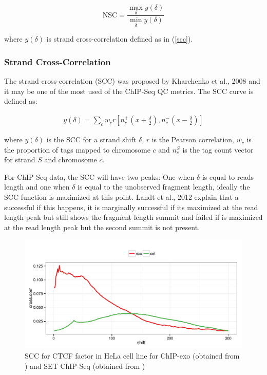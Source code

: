\documentclass[11pt]{article}\usepackage[]{graphicx}\usepackage[]{color}
\begin{document}
\[
\mbox{NSC} = \frac{ \max_\delta y(\delta)}{\min_\delta y(\delta)}
\]

where $y(\delta)$ is strand cross-correlation defined as in (\ref{scc}). 

\subsubsection{Strand Cross-Correlation}
\label{sec:scc}

The strand cross-correlation (SCC) was proposed by Kharchenko et al.,
2008 \cite{strandcc} and it may be one of the most used of the
ChIP-Seq QC metrics. The SCC curve is defined as:

\begin{align}
  y(\delta) = \sum_c w_c r\left[ n_c^+ \left(x + \frac{\delta}{2}
    \right), n_c^- \left( x- \frac{\delta}{2} \right)\right]
\label{scc}
\end{align}

where $y(\delta)$ is the SCC for a strand shift $\delta$, $r$ is the
Pearson correlation, $w_c$ is the proportion of tags mapped to
chromosome $c$ and $n_c^S$ is the tag count vector for strand $S$ and
chromosome $c$.

For ChIP-Seq data, the SCC will have two peaks: One when $\delta$ is
equal to reads length and one when $\delta$ is equal to the unobserved
fragment length, ideally the SCC function is maximized at this
point. Landt et al., 2012 \cite{encode_qc} explain that a successful if
this happens, it is marginally successful if its maximized at the read
length peak but still shows the fragment length summit and failed if
is maximized at the read length peak but the second summit is not
present. 

\begin{figure}[H]
  \centering  
\includegraphics[width = .7\textwidth]{../figs/for_paper/scc_ctcf.pdf}
  \caption{SCC for CTCF factor in HeLa cell line for ChIP-exo (obtained from \cite{exo1}) and SET ChIP-Seq (obtained from \cite{encode1}) }
  \label{fig:scc}
\end{figure}
\end{document}
